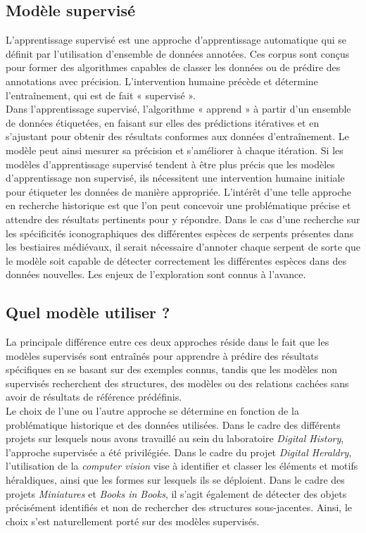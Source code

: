 \documentclass[12pt,twoside]{book}
\begin{document}
\subsection{Modèle supervisé}

L'apprentissage supervisé est une approche d'apprentissage automatique qui se définit par l'utilisation d’ensemble de données annotées. Ces corpus sont conçus pour former des algorithmes capables de classer les données ou de prédire des annotations avec précision. L’intervention humaine précède et détermine l’entraînement, qui est de fait « supervisé ». \\

Dans l'apprentissage supervisé, l'algorithme « apprend » à partir d’un ensemble de données étiquetées, en faisant sur elles des prédictions itératives et en s'ajustant pour obtenir des résultats conformes aux données d’entraînement. Le modèle peut ainsi mesurer sa précision et s’améliorer à chaque itération. Si les modèles d'apprentissage supervisé tendent à être plus précis que les modèles d'apprentissage non supervisé, ils nécessitent une intervention humaine initiale pour étiqueter les données de manière appropriée. L’intérêt d’une telle approche en recherche historique est que l’on peut concevoir une problématique précise et attendre des résultats pertinents pour y répondre. Dans le cas d’une recherche sur les spécificités iconographiques des différentes espèces de serpents présentes dans les bestiaires médiévaux, il serait nécessaire d’annoter chaque serpent de sorte que le modèle soit capable de détecter correctement les différentes espèces dans des données nouvelles. Les enjeux de l’exploration sont connus à l’avance. 

\subsection{Quel modèle utiliser ?}

La principale différence entre ces deux approches réside dans le fait que les modèles supervisés sont entraînés pour apprendre à prédire des résultats spécifiques en se basant sur des exemples connus, tandis que les modèles non supervisés recherchent des structures, des modèles ou des relations cachées sans avoir de résultats de référence prédéfinis. \\

Le choix de l’une ou l’autre approche se détermine en fonction de la problématique historique et des données utilisées. Dans le cadre des différents projets sur lesquels nous avons travaillé au sein du laboratoire \textit{Digital History}, l’approche supervisée a été privilégiée. Dans le cadre du projet \textit{Digital Heraldry}, l’utilisation de la \textit{computer vision} vise à identifier et classer les éléments et motifs héraldiques, ainsi que les formes sur lesquels ils se déploient. Dans le cadre des projets \textit{Miniatures} et \textit{Books in Books}, il s’agit également de détecter des objets précisément identifiés et non de rechercher des structures sous-jacentes. Ainsi, le choix s'est naturellement porté sur des modèles supervisés.\\ 
\end{document}
